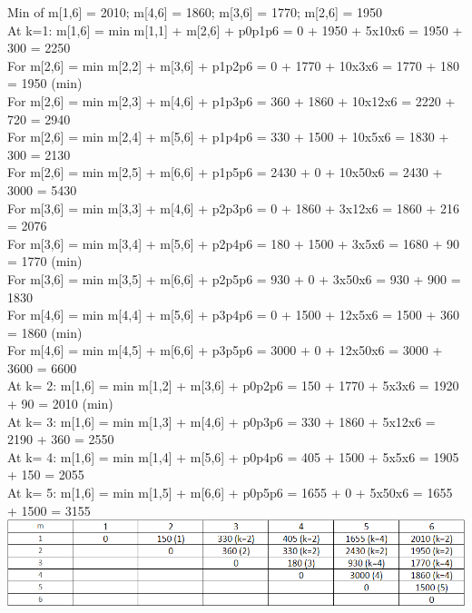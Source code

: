 \documentclass[addpoints,11pt]{exam}
\begin{document}
\begin{questions}
\begin{solutionorbox}
Min of m[1,6] = 2010; m[4,6] = 1860; m[3,6] = 1770; m[2,6] = 1950\\
At k=1: m[1,6] = {min {m[1,1] + m[2,6] + p0p1p6}}  = 0 + 1950 + 5x10x6 = 1950 + 300 = 2250\\
\hspace{5mm}For m[2,6] = {min {m[2,2] + m[3,6] + p1p2p6}} = 0 + 1770 + 10x3x6 = 1770 + 180 = 1950 (min)\\
\hspace*{5mm}For m[2,6] = {min {m[2,3] + m[4,6] + p1p3p6}} = 360 + 1860 + 10x12x6 = 2220 + 720 = 2940\\
\hspace*{5mm}For m[2,6] = {min {m[2,4] + m[5,6] + p1p4p6}} = 330 + 1500 + 10x5x6 = 1830 + 300 = 2130\\
\hspace*{5mm}For m[2,6] = {min {m[2,5] + m[6,6] + p1p5p6}} = 2430 + 0 + 10x50x6 = 2430 + 3000 = 5430\\
\hspace*{5mm}For m[3,6] = {min {m[3,3] + m[4,6] + p2p3p6}} = 0 + 1860 + 3x12x6 = 1860 + 216 = 2076 \\
\hspace*{5mm}For m[3,6] = {min {m[3,4] + m[5,6] + p2p4p6}} = 180 + 1500 + 3x5x6 = 1680 + 90 = 1770 (min)\\
\hspace*{5mm}For m[3,6] = {min {m[3,5] + m[6,6] + p2p5p6}} = 930 + 0 + 3x50x6 = 930 + 900 = 1830 \\
\hspace*{5mm}For m[4,6] = {min {m[4,4] + m[5,6] + p3p4p6}} = 0 + 1500 + 12x5x6 = 1500 + 360 = 1860 (min)\\
\hspace*{5mm}For m[4,6] = {min {m[4,5] + m[6,6] + p3p5p6}} = 3000 + 0 + 12x50x6 = 3000 + 3600 = 6600\\
At k= 2: m[1,6] = {min {m[1,2] + m[3,6] + p0p2p6}} = 150 + 1770 + 5x3x6 = 1920 + 90 = 2010 (min)\\ 
At k= 3: m[1,6] = {min {m[1,3] + m[4,6] + p0p3p6}} = 330 + 1860 + 5x12x6 = 2190 + 360 = 2550\\
At k= 4: m[1,6] = {min {m[1,4] + m[5,6] + p0p4p6}} = 405 + 1500 + 5x5x6 = 1905 + 150 = 2055\\
At k= 5: m[1,6] = {min {m[1,5] + m[6,6] + p0p5p6}} = 1655 + 0 + 5x50x6 = 1655 + 1500 = 3155\\

\includegraphics[scale=.75]{Image2.png}


\end{solutionorbox}
\end{questions}
\end{document}
